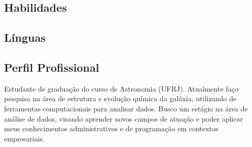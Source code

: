     \vspace*{-1em}
    \begin{tcolorbox}
        \vspace*{-0.5em}
        \begin{minipage}[t]{0.3\textwidth} %
            \begin{tcolorbox}[height=0.8\textheight, grow to left by=0.6cm,colback=backdrop,colframe=backdrop,arc=0mm]

                \subsection*{Habilidades}

                \subsection*{Línguas}
            \end{tcolorbox}
        \end{minipage}
        \begin{minipage}[t]{0.7\textwidth} %
            \begin{tcolorbox}[grow to right by=0.75cm,height=0.8\textheight,colframe=white,colback=white]

                \section*{Perfil Profissional}
                    Estudante de graduação do curso de Astronomia (UFRJ). Atualmente faço pesquisa na área de estrutura e evolução química da galáxia, utilizando de ferramentas computacionais para analisar dados. Busco um estágio na área de análise de dados, visando aprender novos campos de atuação e poder aplicar meus conhecimentos administrativos e de programação em contextos empresariais.  


\end{tcolorbox}
\end{minipage}
\end{tcolorbox}
